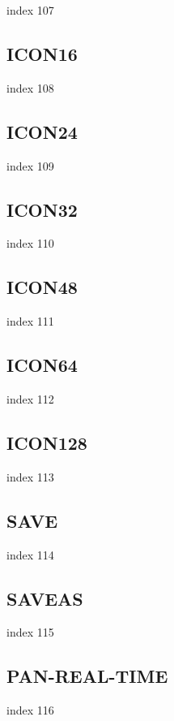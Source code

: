 \documentclass[11pt]{report}
\begin{document}
index 107

\subsection{ICON16}

index 108

\subsection{ICON24}

index 109

\subsection{ICON32}

index 110

\subsection{ICON48}

index 111

\subsection{ICON64}

index 112

\subsection{ICON128}

index 113

\subsection{SAVE}

index 114

\subsection{SAVEAS}

index 115

\subsection{PAN-REAL-TIME}

index 116
\end{document}
